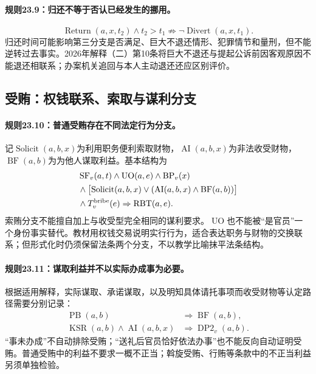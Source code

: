 \paragraph{规则23.9：归还不等于否认已经发生的挪用。}
\[
\operatorname{Return}(a,x,t_2)\land t_2>t_1
\nRightarrow\neg\operatorname{Divert}(a,x,t_1).
\]
归还时间可能影响第三分支是否满足、巨大不退还情形、犯罪情节和量刑，但不能逆转过去事实。2026年解释（二）第10条将巨大不退还与提起公诉前因客观原因不能退还相联系；办案机关追回与本人主动退还还应区别评价。

\subsection{受贿：权钱联系、索取与谋利分支}
\paragraph{规则23.10：普通受贿存在不同法定行为分支。}
记$\operatorname{Solicit}(a,b,x)$为利用职务便利索取财物，$\operatorname{AI}(a,b,x)$为非法收受财物，$\operatorname{BF}(a,b)$为为他人谋取利益。基本结构为
\[
\begin{aligned}
&\operatorname{SF}_v(a,t)\land\operatorname{UO}(a,e)
\land\operatorname{BP}_v(x)\\
&\quad\land\bigl[\operatorname{Solicit}(a,b,x)
\lor(\operatorname{AI}(a,b,x)\land\operatorname{BF}(a,b))\bigr]\\
&\quad\land T^{\rm bribe}_v(e)
\Rightarrow\operatorname{RBT}(a,e).
\end{aligned}
\]
索贿分支不能擅自加上与收受型完全相同的谋利要求。$\operatorname{UO}$也不能被“是官员”一个身份事实替代。教材用权钱交易说明实行行为，适合表达职务与财物的交换联系；但形式化时仍须保留法条两个分支，不以教学比喻抹平法条结构。

\paragraph{规则23.11：谋取利益并不以实际办成事为必要。}
根据适用解释，实际谋取、承诺谋取，以及明知具体请托事项而收受财物等认定路径需要分别记录：
\[
\begin{aligned}
\operatorname{PB}(a,b)&\Rightarrow\operatorname{BF}(a,b),\\
\operatorname{KSR}(a,b)\land\operatorname{AI}(a,b,x)
&\Rightarrow\operatorname{DP2}_v(a,b).
\end{aligned}
\]
“事未办成”不自动排除受贿；“送礼后官员恰好依法办事”也不能反向自动证明受贿。普通受贿中的利益不要求一概不正当；斡旋受贿、行贿等条款中的不正当利益另须单独检验。

